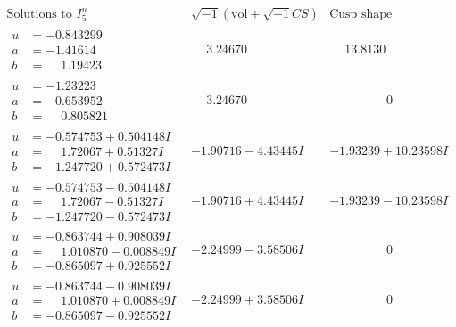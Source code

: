 \documentclass[1p]{elsarticle_modified}
\theoremstyle{definition}
\newcommand{\I}{\sqrt{-1}}
\begin{document}
$$\begin{array}{c|c|c}  
\text{Solutions to }I^u_{5}& \I (\text{vol} + \sqrt{-1}CS) & \text{Cusp shape}\\
 \hline 
\begin{aligned}
u &= -0.843299\phantom{ +0.000000I} \\
a &= -1.41614\phantom{ +0.000000I} \\
b &= \phantom{-}1.19423\phantom{ +0.000000I}\end{aligned}
 & \phantom{-}3.24670\phantom{ +0.000000I} & \phantom{-}13.8130\phantom{ +0.000000I} \\ \hline\begin{aligned}
u &= -1.23223\phantom{ +0.000000I} \\
a &= -0.653952\phantom{ +0.000000I} \\
b &= \phantom{-}0.805821\phantom{ +0.000000I}\end{aligned}
 & \phantom{-}3.24670\phantom{ +0.000000I} & \phantom{-0.000000 } 0 \\ \hline\begin{aligned}
u &= -0.574753 + 0.504148 I \\
a &= \phantom{-}1.72067 + 0.51327 I \\
b &= -1.247720 + 0.572473 I\end{aligned}
 & -1.90716 - 4.43445 I & -1.93239 + 10.23598 I \\ \hline\begin{aligned}
u &= -0.574753 - 0.504148 I \\
a &= \phantom{-}1.72067 - 0.51327 I \\
b &= -1.247720 - 0.572473 I\end{aligned}
 & -1.90716 + 4.43445 I & -1.93239 - 10.23598 I \\ \hline\begin{aligned}
u &= -0.863744 + 0.908039 I \\
a &= \phantom{-}1.010870 - 0.008849 I \\
b &= -0.865097 + 0.925552 I\end{aligned}
 & -2.24999 - 3.58506 I & \phantom{-0.000000 } 0 \\ \hline\begin{aligned}
u &= -0.863744 - 0.908039 I \\
a &= \phantom{-}1.010870 + 0.008849 I \\
b &= -0.865097 - 0.925552 I\end{aligned}
 & -2.24999 + 3.58506 I & \phantom{-0.000000 } 0 \\ \hline\begin{aligned}

\end{aligned}
\end{array}$$
\end{document}
